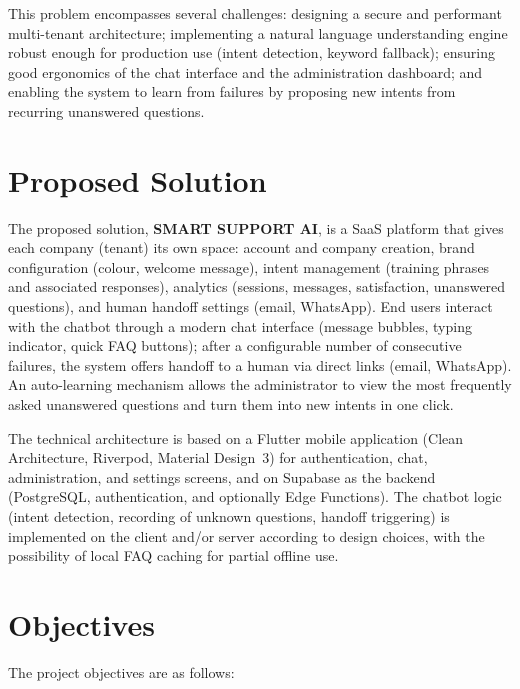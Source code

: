 \documentclass[12pt,a4paper]{report}
\begin{document}
This problem encompasses several challenges: designing a secure and performant multi-tenant architecture; implementing a natural language understanding engine robust enough for production use (intent detection, keyword fallback); ensuring good ergonomics of the chat interface and the administration dashboard; and enabling the system to learn from failures by proposing new intents from recurring unanswered questions.

\section{Proposed Solution}

The proposed solution, \textbf{SMART SUPPORT AI}, is a SaaS platform that gives each company (tenant) its own space: account and company creation, brand configuration (colour, welcome message), intent management (training phrases and associated responses), analytics (sessions, messages, satisfaction, unanswered questions), and human handoff settings (email, WhatsApp). End users interact with the chatbot through a modern chat interface (message bubbles, typing indicator, quick FAQ buttons); after a configurable number of consecutive failures, the system offers handoff to a human via direct links (email, WhatsApp). An auto-learning mechanism allows the administrator to view the most frequently asked unanswered questions and turn them into new intents in one click.

The technical architecture is based on a Flutter mobile application (Clean Architecture, Riverpod, Material Design~3) for authentication, chat, administration, and settings screens, and on Supabase as the backend (PostgreSQL, authentication, and optionally Edge Functions). The chatbot logic (intent detection, recording of unknown questions, handoff triggering) is implemented on the client and/or server according to design choices, with the possibility of local FAQ caching for partial offline use.

\section{Objectives}

The project objectives are as follows:
\end{document}
